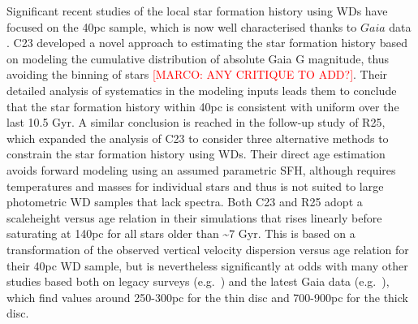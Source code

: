 \documentclass[fleqn,usenatbib]{mnras}
\begin{document}
\textcolor{nick}{
%
Significant recent studies of the local star formation history using WDs have
focused on the 40pc sample, which is now well characterised thanks to $Gaia$ data
\citep{2024MNRAS.527.8687O}.
%
C23 developed a novel approach to estimating the star formation history based on
modeling the cumulative distribution of absolute Gaia G magnitude, thus avoiding the
binning of stars \textcolor{red}{[MARCO: ANY CRITIQUE TO ADD?]}.
%
Their detailed analysis of systematics in the modeling inputs leads them to conclude
that the star formation history within 40pc is consistent with uniform over the last
10.5 Gyr.
%
A similar conclusion is reached in the follow-up study of R25, which expanded the
analysis of C23 to consider three alternative methods to constrain the star formation
history using WDs.
%
Their direct age estimation avoids forward modeling using an assumed parametric
SFH, although requires temperatures and masses for individual stars
and thus is not suited to large photometric WD samples that lack spectra.
%
Both C23 and R25 adopt a scaleheight versus age relation in their simulations that
rises linearly before saturating at 140pc for all stars older than \textasciitilde7 Gyr.
%
This is based on a transformation of the observed vertical velocity dispersion versus age
relation for their 40pc WD sample, but is nevertheless significantly at odds with many 
other studies based both on legacy surveys
(e.g.~\citealt{2006AJ....131..571H,2008ApJ...673..864J,2017ApJ...837..162K}) and the 
latest Gaia data
(e.g.~\citealp{2019MNRAS.482.4570G,2022MNRAS.511.3863E,2023Galax..11...77V}),
which find values around 250-300pc for the thin disc and 700-900pc for the thick disc.
}
%
%
\end{document}
